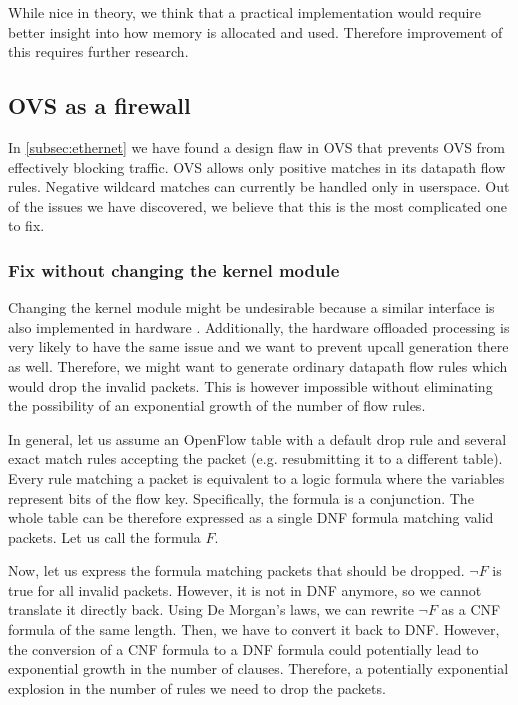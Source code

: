 While nice in theory, we think that a practical implementation would require better insight into how memory is allocated and used. Therefore improvement of this requires further research.

\subsection{OVS as a firewall}

In \cref{subsec:ethernet} we have found a design flaw in OVS that prevents OVS from effectively blocking traffic. OVS allows only positive matches in its datapath flow rules. Negative wildcard matches can currently be handled only in userspace. Out of the issues we have discovered, we believe that this is the most complicated one to fix. 

\subsubsection{Fix without changing the kernel module}
Changing the kernel module might be undesirable because a similar interface is also implemented in hardware \cite{OVSHW}. Additionally, the hardware offloaded processing is very likely to have the same issue and we want to prevent upcall generation there as well. Therefore, we might want to generate ordinary datapath flow rules which would drop the invalid packets. This is however impossible without eliminating the possibility of an exponential growth of the number of flow rules.

In general, let us assume an OpenFlow table with a default drop rule and several exact match rules accepting the packet (e.g. resubmitting it to a different table). Every rule matching a packet is equivalent to a logic formula where the variables represent bits of the flow key. Specifically, the formula is a conjunction. The whole table can be therefore expressed as a single DNF formula matching valid packets. Let us call the formula $F$.

Now, let us express the formula matching packets that should be dropped. $\neg F$ is true for all invalid packets. However, it is not in DNF anymore, so we cannot translate it directly back. Using De Morgan's laws, we can rewrite $\neg F$ as a CNF formula of the same length. Then, we have to convert it back to DNF. However, the conversion of a CNF formula to a DNF formula could potentially lead to exponential growth in the number of clauses. Therefore, a potentially exponential explosion in the number of rules we need to drop the packets.

